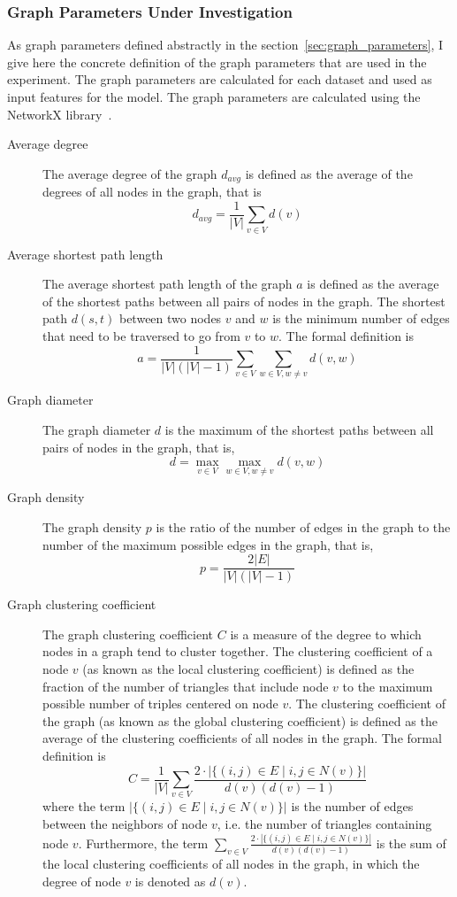 \documentclass{article}
\begin{document}
\subsubsection{Graph Parameters Under Investigation}
As graph parameters defined abstractly in the section~\ref{sec:graph_parameters}, I give here the concrete definition of the graph parameters that are used in the experiment. The graph parameters are calculated for each dataset and used as input features for the model. The graph parameters are calculated using the NetworkX library~\cite{hagberg2008exploring}.

\begin{description}
    \item [Average degree] The average degree of the graph $d_{avg}$ is defined as the average of the degrees of all nodes in the graph, that is
    $$ d_{avg} = \frac{1}{|V|} \sum_{v \in V} d(v)$$
    \item [Average shortest path length] The average shortest path length of the graph $a$ is defined as the average of the shortest paths between all pairs of nodes in the graph. The shortest path $d(s, t)$ between two nodes $v$ and $w$ is the minimum number of edges that need to be traversed to go from $v$ to $w$. The formal definition is
    $$
a = \frac{1}{|V|(|V|-1)} \sum_{v \in V} \sum_{w \in V, w \neq v} d(v, w)
    $$

    \item [Graph diameter] The graph diameter $d$ is the maximum of the shortest paths between all pairs of nodes in the graph, that is,
    $$
d = \max_{v \in V} \max_{w \in V, w \neq v} d(v, w)
    $$

    \item [Graph density] The graph density $p$ is the ratio of the number of edges in the graph to the number of the maximum possible edges in the graph, that is,
    $$
p = \frac{2|E|}{|V|(|V|-1)}
    $$
    
    \item [Graph clustering coefficient] The graph clustering coefficient $C$ is a measure of the degree to which nodes in a graph tend to cluster together. The clustering coefficient of a node $v$ (as known as the local clustering coefficient) is defined as the fraction of the number of triangles that include node $v$ to the maximum possible number of triples centered on node $v$. The clustering coefficient of the graph (as known as the global clustering coefficient) is defined as the average of the clustering coefficients of all nodes in the graph. The formal definition is
    $$
C = \frac{1}{|V|} \sum_{v \in V} \frac{2\cdot |\{(i,j)\in E \mid i, j \in N(v)\}|}{d(v)(d(v)-1)}
    $$
    where the term $|\{(i,j)\in E \mid i, j \in N(v)\}|$ is the number of edges between the neighbors of node $v$, i.e. the number of triangles containing node $v$. Furthermore, the term $\sum_{v \in V} \frac{2\cdot |\{(i,j)\in E \mid i, j \in N(v)\}|}{d(v)(d(v)-1)}$ is the sum of the local clustering coefficients of all nodes in the graph, in which the degree of node $v$ is denoted as $d(v)$.


\end{description}
\end{document}
